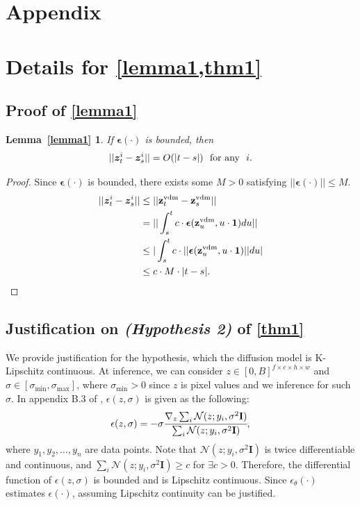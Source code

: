 
\clearpage

\section*{\Large{Appendix}}

\section{Details for \cref{lemma1,thm1}}

\subsection{Proof of \cref{lemma1}} 
\label{app:proof}   

\newtheorem*{L1}{{\normalfont\textbf{Lemma~\ref{lemma1}}}}

\begin{L1}
    If $\bm{\epsilon}(\cdot)$ is bounded, then
    \begin{align*}
        ||\bm{z}_{t}^i - \bm{z}_{s}^i|| = O(|t - s|) ~~\text{for any} ~~i.
    \end{align*}
\end{L1}  

\begin{proof}
    Since $\bm\epsilon(\cdot)$ is bounded, there exists some $M>0$ satisfying $||\bm\epsilon(\cdot)|| \leq M$.
    \begin{align*}
        ||\bm{z}_{t}^i - \bm{z}_{s}^i|| 
        &\leq ||\mathbf{z}_{t}^\text{vdm} - \mathbf{z}_{s}^\text{vdm}|| \\
        &= ||\int_s^t c\cdot \bm\epsilon(\mathbf{z}_{u}^\text{vdm},u\cdot\bm{1})du|| \\
        &\leq |\int_s^t c \cdot ||\bm\epsilon(\mathbf{z}_{u}^\text{vdm},u\cdot\bm{1})||du| \\
        &\leq c\cdot M\cdot|t-s|.
    \end{align*}
\end{proof}

\subsection{Justification on \textit{(Hypothesis 2)} of \cref{thm1}} 
\label{app:justification}
We provide justification for the hypothesis, which the diffusion model is K-Lipschitz continuous.
At inference, we can consider $z\in[0,B]^{f\times c\times h \times w}$ and $\sigma \in [\sigma_\text{min}, \sigma_\text{max}]$, where $\sigma_\text{min}>0$ since $z$ is pixel values and we inference for such $\sigma$.
In appendix B.3 of \citep{karras2022elucidating}, $\epsilon(z,\sigma)$ is given as the following:
$$\epsilon(z,\sigma)= -\sigma \cfrac{\nabla_{z} \sum_i \mathcal{N}(z;y_i,\sigma^2 \mathbf{I})}{\sum_i \mathcal{N}(z;y_i,\sigma^2 \mathbf{I})},$$
where ${ y_1, y_2, \ldots, y_n}$ are data points. Note that $\mathcal{N}(z;y_i, \sigma^2 \mathbf{I})$ is twice differentiable and continuous,
and $\sum_i \mathcal{N}(z;y_i,\sigma^2 \mathbf{I}) \geq c$ for $\exists c>0$.
Therefore, the differential function of $\epsilon(z,\sigma)$ is bounded and is Lipschitz continuous. Since $\epsilon_\theta(\cdot)$ estimates $\epsilon(\cdot)$, assuming Lipschitz continuity can be justified.

